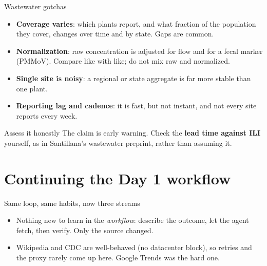 \documentclass[aspectratio=169,11pt]{beamer}
\begin{document}
\begin{frame}{Wastewater gotchas}
  \begin{itemize}
    \item \textbf{Coverage varies}: which plants report, and what fraction of the population
          they cover, changes over time and by state. Gaps are common.
    \item \textbf{Normalization}: raw concentration is adjusted for flow and for a fecal
          marker (PMMoV). Compare like with like; do not mix raw and normalized.
    \item \textbf{Single site is noisy}: a regional or state aggregate is far more stable
          than one plant.
    \item \textbf{Reporting lag and cadence}: it is fast, but not instant, and not every
          site reports every week.
  \end{itemize}
  \vspace{0.3em}
  \begin{alertblock}{Assess it honestly}
    The claim is early warning. Check the \textbf{lead time against ILI} yourself, as in
    Santillana's wastewater preprint, rather than assuming it.
  \end{alertblock}
\end{frame}

\section{Continuing the Day 1 workflow}

\begin{frame}{Same loop, same habits, now three streams}
  \begin{center}
  \end{center}
  \vspace{0.4em}
  \begin{itemize}
    \item Nothing new to learn in the \emph{workflow}: describe the outcome, let the agent
          fetch, then verify. Only the source changed.
    \item Wikipedia and CDC are well-behaved (no datacenter block), so retries and the proxy
          rarely come up here. Google Trends was the hard one.
  \end{itemize}
\end{frame}
\end{document}
